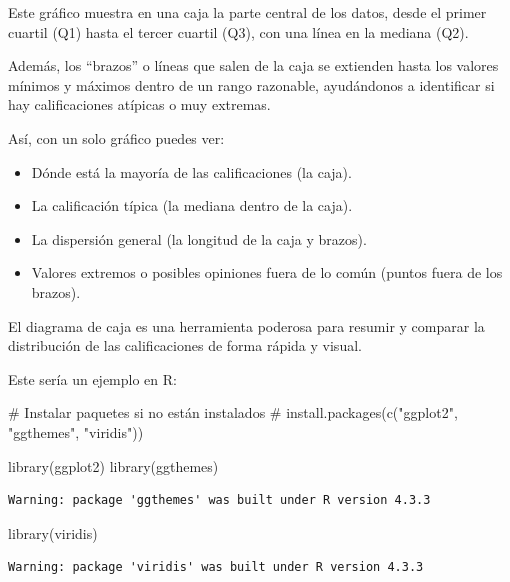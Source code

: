 \documentclass[
  spanish,
  letterpaper,
  DIV=11,
  numbers=noendperiod]{scrreprt}
\newenvironment{Shaded}{\begin{snugshade}}{\end{snugshade}}
\newcommand{\CommentTok}[1]{\textcolor[rgb]{0.37,0.37,0.37}{#1}}
\newcommand{\FunctionTok}[1]{\textcolor[rgb]{0.28,0.35,0.67}{#1}}
\newcommand{\NormalTok}[1]{\textcolor[rgb]{0.00,0.23,0.31}{#1}}
\providecommand{\tightlist}{%
  \setlength{\itemsep}{0pt}\setlength{\parskip}{0pt}}
\begin{document}
Este gráfico muestra en una caja la parte central de los datos, desde el
primer cuartil (Q1) hasta el tercer cuartil (Q3), con una línea en la
mediana (Q2).

Además, los ``brazos'' o líneas que salen de la caja se extienden hasta
los valores mínimos y máximos dentro de un rango razonable, ayudándonos
a identificar si hay calificaciones atípicas o muy extremas.

Así, con un solo gráfico puedes ver:

\begin{itemize}
\tightlist
\item
  Dónde está la mayoría de las calificaciones (la caja).\\
\item
  La calificación típica (la mediana dentro de la caja).\\
\item
  La dispersión general (la longitud de la caja y brazos).\\
\item
  Valores extremos o posibles opiniones fuera de lo común (puntos fuera
  de los brazos).
\end{itemize}

El diagrama de caja es una herramienta poderosa para resumir y comparar
la distribución de las calificaciones de forma rápida y visual.

Este sería un ejemplo en R:

\begin{Shaded}
\begin{Highlighting}[]
\CommentTok{\# Instalar paquetes si no están instalados}
\CommentTok{\# install.packages(c("ggplot2", "ggthemes", "viridis"))}

\FunctionTok{library}\NormalTok{(ggplot2)}
\FunctionTok{library}\NormalTok{(ggthemes)}
\end{Highlighting}
\end{Shaded}

\begin{verbatim}
Warning: package 'ggthemes' was built under R version 4.3.3
\end{verbatim}

\begin{Shaded}
\begin{Highlighting}[]
\FunctionTok{library}\NormalTok{(viridis)}
\end{Highlighting}
\end{Shaded}

\begin{verbatim}
Warning: package 'viridis' was built under R version 4.3.3
\end{verbatim}
\end{document}
